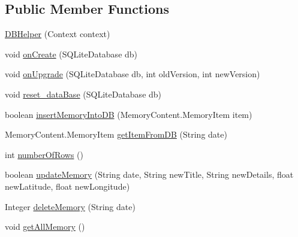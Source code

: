 \subsection*{Public Member Functions}
\begin{DoxyCompactItemize}
\item 
\hyperlink{classcom_1_1example_1_1memorism_1_1memory_1_1_d_b_helper_a1a910311426223624f16314574fc8395}{D\+B\+Helper} (Context context)
\item 
void \hyperlink{classcom_1_1example_1_1memorism_1_1memory_1_1_d_b_helper_af116d080f66582b43bf7cc392862f1cd}{on\+Create} (S\+Q\+Lite\+Database db)
\item 
void \hyperlink{classcom_1_1example_1_1memorism_1_1memory_1_1_d_b_helper_a10e47b5b5978e7f89ec326cf3782c2b0}{on\+Upgrade} (S\+Q\+Lite\+Database db, int old\+Version, int new\+Version)
\item 
void \hyperlink{classcom_1_1example_1_1memorism_1_1memory_1_1_d_b_helper_a5a10d27ab67b8b21fe6a4791138596a2}{reset\+\_\+data\+Base} (S\+Q\+Lite\+Database db)
\item 
boolean \hyperlink{classcom_1_1example_1_1memorism_1_1memory_1_1_d_b_helper_a377fbc795ffd8620bd16276bc373f9e9}{insert\+Memory\+Into\+DB} (Memory\+Content.\+Memory\+Item item)
\item 
Memory\+Content.\+Memory\+Item \hyperlink{classcom_1_1example_1_1memorism_1_1memory_1_1_d_b_helper_ae2b30388cd48178666c0fa93ef9362b6}{get\+Item\+From\+DB} (String date)
\item 
int \hyperlink{classcom_1_1example_1_1memorism_1_1memory_1_1_d_b_helper_ace53414fe54d6caa930a1453ab7d237a}{number\+Of\+Rows} ()
\item 
boolean \hyperlink{classcom_1_1example_1_1memorism_1_1memory_1_1_d_b_helper_aa40fc6dae948e51c155f23695c2af9c6}{update\+Memory} (String date, String new\+Title, String new\+Details, float new\+Latitude, float new\+Longitude)
\item 
Integer \hyperlink{classcom_1_1example_1_1memorism_1_1memory_1_1_d_b_helper_a93e6cb1b1f1bc8d39aeaace04dc92446}{delete\+Memory} (String date)
\item 
void \hyperlink{classcom_1_1example_1_1memorism_1_1memory_1_1_d_b_helper_a82845616a8210bace5188f41aaef1594}{get\+All\+Memory} ()
\end{DoxyCompactItemize}
